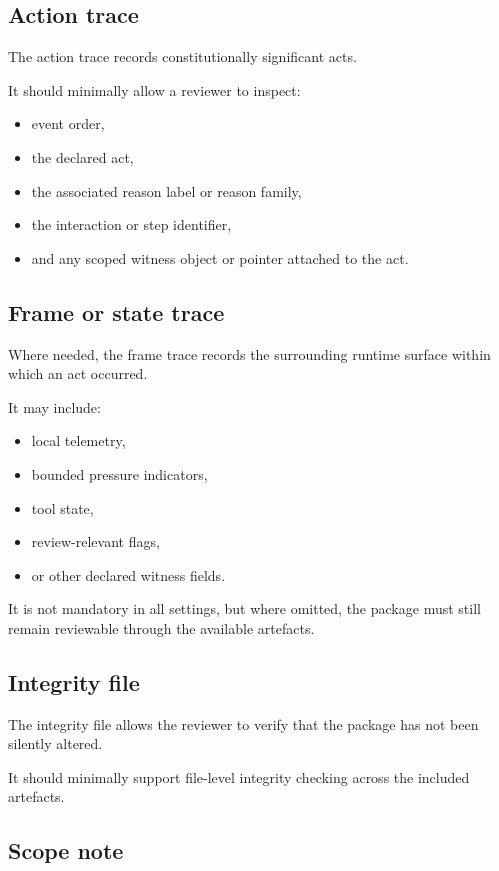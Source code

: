 \documentclass[11pt]{article}
\begin{document}
\subsection{Action trace}

The action trace records constitutionally significant acts.

It should minimally allow a reviewer to inspect:
\begin{itemize}[leftmargin=2em]
    \item event order,
    \item the declared act,
    \item the associated reason label or reason family,
    \item the interaction or step identifier,
    \item and any scoped witness object or pointer attached to the act.
\end{itemize}

\subsection{Frame or state trace}

Where needed, the frame trace records the surrounding runtime surface within which an act occurred.

It may include:
\begin{itemize}[leftmargin=2em]
    \item local telemetry,
    \item bounded pressure indicators,
    \item tool state,
    \item review-relevant flags,
    \item or other declared witness fields.
\end{itemize}

It is not mandatory in all settings, but where omitted, the package must still remain reviewable through the available artefacts.

\subsection{Integrity file}

The integrity file allows the reviewer to verify that the package has not been silently altered.

It should minimally support file-level integrity checking across the included artefacts.

\subsection{Scope note}
\end{document}
